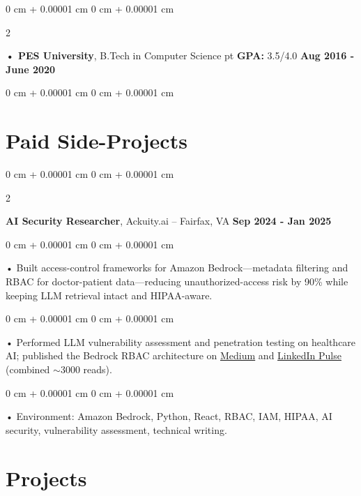 \documentclass[10pt, letterpaper]{article}
\newenvironment{onecolentry}{
    \begin{adjustwidth}{
        0 cm + 0.00001 cm
    }{
        0 cm + 0.00001 cm
    }
}{
    \end{adjustwidth}
} %
\newenvironment{twocolentry}[2][]{
    \onecolentry
    \def\secondColumn{#2}
    \setcolumnwidth{\fill, 4.5 cm}
    \begin{paracol}{2}
}{
    \switchcolumn \raggedleft \secondColumn
    \end{paracol}
    \endonecolentry
} %
\begin{document}
        \begin{twocolentry}{
            \textbf{Aug 2016 - June 2020}
        }
            \textbf{ • PES University}, B.Tech in Computer Science  pt \textbf{GPA:} 3.5/4.0  \end{twocolentry}
        \begin{onecolentry}

                        \vspace{0.4cm}
    \section{Paid Side-Projects}
            \vspace{2 pt }
                    \begin{twocolentry}{
            \textbf{Sep 2024 - Jan 2025}
        }
            \textbf{AI Security Researcher}, Ackuity.ai -- Fairfax, VA\end{twocolentry}

        \begin{onecolentry}
             • Built access-control frameworks for Amazon Bedrock---metadata filtering and RBAC for doctor-patient data---reducing unauthorized-access risk by 90\% while keeping LLM retrieval intact and HIPAA-aware.
        \end{onecolentry}
        \begin{onecolentry}
             • Performed LLM vulnerability assessment and penetration testing on healthcare AI; published the Bedrock RBAC architecture on \href{https://medium.com/@sreenikethaathreya/building-a-permission-aware-genai-application-on-amazon-bedrock-8fdc2410dd43}{Medium} and \href{https://www.linkedin.com/pulse/building-permission-aware-genai-application-amazon-bedrock-aathreya-g7nme/}{LinkedIn Pulse} (combined {$\sim$}3000 reads).
        \end{onecolentry}
        \begin{onecolentry}
             • Environment: Amazon Bedrock, Python, React, RBAC, IAM, HIPAA, AI security, vulnerability assessment, technical writing.

        \end{onecolentry}

        \vspace{0.4cm}
\section{Projects}
    \vspace{2 pt}
\end{onecolentry}
\end{document}
